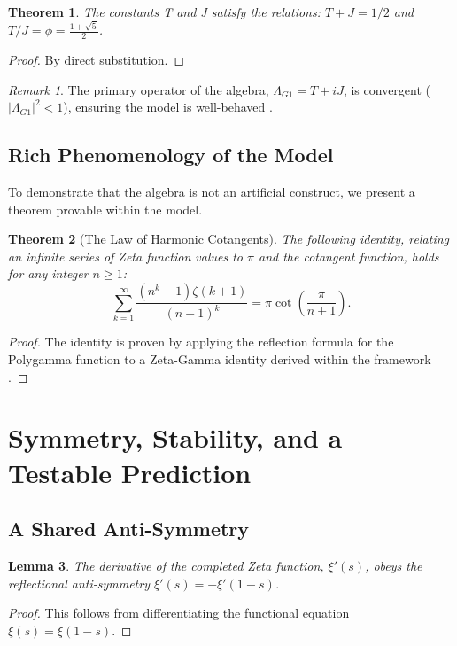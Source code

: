 \documentclass{amsart}
\theoremstyle{plain}
\newtheorem{theorem}{Theorem}
\newtheorem{lemma}[theorem]{Lemma}
\theoremstyle{definition}
\theoremstyle{remark}
\newtheorem*{remark}{Remark}
\begin{document}
\begin{theorem}
The constants T and J satisfy the relations: $T+J = 1/2$ and $T/J = \phi = \frac{1+\sqrt{5}}{2}$.
\end{theorem}
\begin{proof}
By direct substitution.
\end{proof}

\begin{remark}
The primary operator of the algebra, $\Lambda_{G1} = T+iJ$, is convergent ($|\Lambda_{G1}|^2 < 1$), ensuring the model is well-behaved \cite{HarrCompendium}.
\end{remark}

\subsection{Rich Phenomenology of the Model}
To demonstrate that the algebra is not an artificial construct, we present a theorem provable within the model.

\begin{theorem}[The Law of Harmonic Cotangents]
The following identity, relating an infinite series of Zeta function values to $\pi$ and the cotangent function, holds for any integer $n \ge 1$:
\[ \sum_{k=1}^{\infty} \frac{(n^k-1)\zeta(k+1)}{(n+1)^k} = \pi \cot\left(\frac{\pi}{n+1}\right). \]
\end{theorem}
\begin{proof}
The identity is proven by applying the reflection formula for the Polygamma function to a Zeta-Gamma identity derived within the framework \cite{HarrCompendium}.
\end{proof}

\section{Symmetry, Stability, and a Testable Prediction}
\subsection{A Shared Anti-Symmetry}
\begin{lemma}
The derivative of the completed Zeta function, $\xi'(s)$, obeys the reflectional anti-symmetry $\xi'(s) = -\xi'(1-s)$.
\end{lemma}
\begin{proof}
This follows from differentiating the functional equation $\xi(s) = \xi(1-s)$.
\end{proof}
\end{document}
